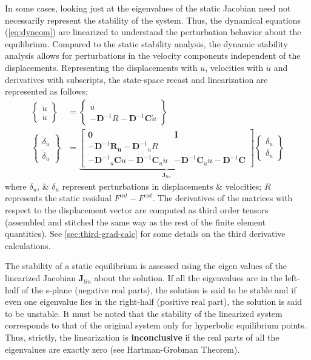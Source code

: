\documentclass[10pt]{article}
\begin{document}
In some cases, looking just at the eigenvalues of the static Jacobian
need not necessarily represent the stability of the system. Thus, the
dynamical equations (\cref{eq:dyneom}) are linearized to understand
the perturbation behavior about the equilibrium. Compared to the
static stability analysis, the dynamic stability analysis allows for
perturbations in the velocity components independent of the
displacements. Representing the displacements with $u$, velocities
with $\dot{u}$ and derivatives with subscripts, the state-space recast
and linearization are represented as follows:
\begin{align*}
  \begin{Bmatrix} \dot{u}\\ \ddot{u} \end{Bmatrix} &= \begin{Bmatrix}
    \dot{u}\\ -\mathbf{D}^{-1}R -
    \mathbf{D}^{-1}\mathbf{C}\dot{u} \end{Bmatrix}\\
  \begin{Bmatrix} \dot{\delta}_u\\
    \dot{\delta}_{\dot{u}} \end{Bmatrix} &= \underbrace{\begin{bmatrix}
      \mathbf{0} & \mathbf{I}\\
      -\mathbf{D}^{-1}\mathbf{R_u}-{\mathbf{D}^{-1}}_uR\\
      -{\mathbf{D}^{-1}}_u\mathbf{C}\dot{u} -
      \mathbf{D}^{-1}{\mathbf{C}}_u\dot{u} &
      -\mathbf{D}^{-1}{\mathbf{C}}_{\dot{u}}\dot{u} -
      \mathbf{D}^{-1}\mathbf{C}
    \end{bmatrix}}_{\mathbf{J}_{lin}} \begin{Bmatrix} \delta_u\\
    \delta_{\dot{u}} \end{Bmatrix} 
\end{align*}
where $\delta_u$, \& $\delta_{\dot{u}}$ represent perturbations in
displacements \& velocities; $R$ represents the static residual
$F^{int}-F^{ext}$. The derivatives of the matrices with respect to the
displacement vector are computed as third order tensors (assembled and
stitched the same way as the rest of the finite element
quantities). See \cref{sec:third-grad-calc} for some details on the
third derivative calculations.

The stability of a static equilibrium is assessed using the eigen
values of the linearized Jacobian $\mathbf{J}_{lin}$ about the
solution. If all the eigenvalues are in the left-half of the s-plane
(negative real parts), the solution is said to be stable and if even
one eigenvalue lies in the right-half (positive real part), the
solution is said to be unstable. It must be noted that the stability
of the linearized system corresponds to that of the original system
only for hyperbolic equilibrium points. Thus, strictly, the
linearization is \textbf{inconclusive} if the real parts of all the
eigenvalues are exactly zero (see Hartman-Grobman Theorem).
\end{document}
